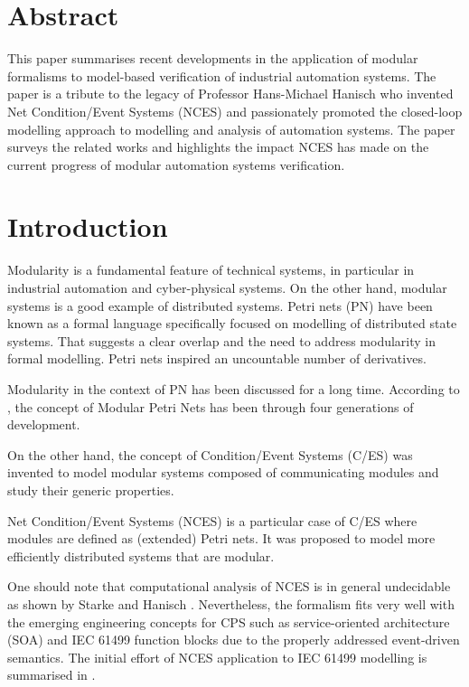 \begin{bibunit}
\thispagestyle{plain}

\section*{Abstract}
This paper summarises recent developments in the application of modular formalisms to model-based verification of industrial automation systems. The paper is a tribute to the legacy of Professor Hans-Michael Hanisch who invented Net Condition/Event Systems (NCES) and passionately promoted the closed-loop modelling approach to modelling and analysis of automation systems. The paper surveys the related works and highlights the impact NCES has made on the current progress of modular automation systems verification.

\section{Introduction}
Modularity is a fundamental feature of technical systems, in particular in industrial automation and cyber-physical systems.
On the other hand, modular systems is a good example of distributed systems.
Petri nets (PN) have been known as a formal language specifically focused on modelling of distributed state systems. That suggests a clear overlap and the need to address modularity in formal modelling. Petri nets inspired an uncountable number of derivatives.

Modularity in the context of PN has been discussed for a long time. 
According to \cite{davidrajuh2019new}, the concept of Modular Petri Nets has been through four generations of development. 

On the other hand, the concept of Condition/Event Systems (C/ES)
 \cite{sreenivas1991condition} was invented to model modular systems composed of communicating modules and study their generic properties.

Net Condition/Event Systems (NCES) \cite{rausch1995net} is a particular case of C/ES where modules are defined as (extended) Petri nets. It was proposed to model more efficiently distributed systems that are modular. 

One should note that computational analysis of NCES is in general undecidable as shown by Starke and Hanisch \cite{starke1997analysis}. Nevertheless, the formalism fits very well with the emerging engineering concepts for CPS such as service-oriented architecture (SOA) and IEC 61499 function blocks due to the properly addressed event-driven semantics. The initial effort of NCES application to IEC 61499 modelling is summarised in \cite{hanisch2009one}.


\end{bibunit}
